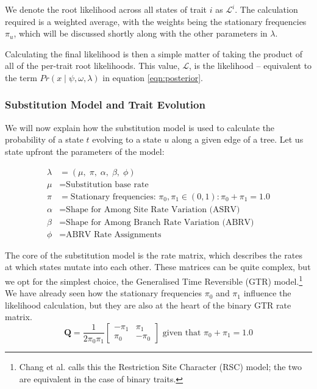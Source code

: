 \documentclass[10pt,journal,compsoc]{IEEEtran}
\begin{document}
We denote the root likelihood across all states of trait $i$ as $\mathcal{L}^{i}$. The calculation required is a weighted average, with the weights being the stationary frequencies $\pi_u$, which will be discussed shortly along with the other parameters in $\lambda$.

Calculating the final likelihood is then a simple matter of taking the product of all of the per-trait root likelihoods. This value, $\mathcal{L}$, is the likelihood -- equivalent to the term $Pr(x\;|\;\psi, \omega, \lambda)$ in equation \eqref{eqn:posterior}.

\subsubsection{Substitution Model and Trait Evolution}

We will now explain how the substitution model is used to calculate the probability of a state $t$ evolving to a state $u$ along a given edge of a tree. Let us state upfront the parameters of the model:

\begin{align*}
    \lambda &= (\mu,\;\pi,\;\alpha,\;\beta,\;\phi)\\
    \mu &= \text{Substitution base rate}\\
    \pi &= \text{Stationary frequencies: } \pi_0, \pi_1 \in \left(0, 1\right) : \pi_0 + \pi_1 = 1.0\\
    \alpha &= \text{Shape for Among Site Rate Variation (ASRV)}\\
    \beta &= \text{Shape for Among Branch Rate Variation (ABRV)}\\
    \phi &= \text{ABRV Rate Assignments}
\end{align*}

The core of the substitution model is the rate matrix, which describes the rates at which states mutate into each other. These matrices can be quite complex, but we opt for the simplest choice, the Generalised Time Reversible (GTR) model.\footnote{Chang et al. calls this the Restriction Site Character (RSC) model; the two are equivalent in the case of binary traits.} We have already seen how the stationary frequencies $\pi_0$ and $\pi_1$ influence the likelihood calculation, but they are also at the heart of the binary GTR rate matrix. 
\begin{equation}\label{eqn:ratematrix}
\textbf{Q} = \frac{1}{2\pi_0\pi_1} \begin{bmatrix}
-\pi_1 & \pi_1\\
\pi_0 & -\pi_0
\end{bmatrix} \text{ \ given that \ } \pi_0 + \pi_1 = 1.0
\end{equation}
\end{document}
